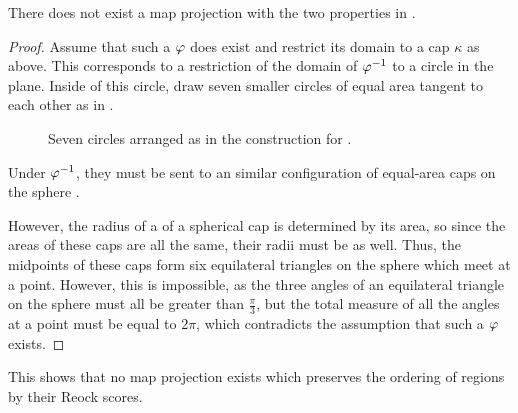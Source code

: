 \begin{theorem}\label{thm:reockbad}
  There does not exist a map projection with the two properties in .
\end{theorem}
\begin{proof}
	
	Assume that such a $\varphi$ does exist and restrict its domain to a cap $\kappa$ as above.  This corresponds to a restriction of the domain of $\varphi^{-1}$ to a circle in the plane.  Inside of this circle, draw seven smaller circles of equal area tangent to each other as in .
	
	
	
  \begin{figure}[!htb]
	\label{fig:sevencircles}
	
	\centering

	
	\caption{Seven circles arranged as in the construction for .}
\end{figure}	
	

  Under $\varphi^{-1}$, they must be sent to an similar configuration 
  of equal-area caps on the sphere .  
  
  However, the radius of a
  of a spherical cap is determined by its area, so since the areas of these caps
  are all the same, their radii must be as well. Thus, 
  the midpoints of these caps form six equilateral triangles on the sphere
   which meet at a point.  However, this is impossible, as the three 
  angles of an equilateral triangle on the sphere must all be greater than $\tfrac{\pi}{3}$, 
  but the total measure of all the angles at a point must be equal to $2\pi$, which contradicts 
  the assumption that such a $\varphi$ exists.
\end{proof}

This shows that no map projection exists which preserves the ordering of regions by their Reock scores.

